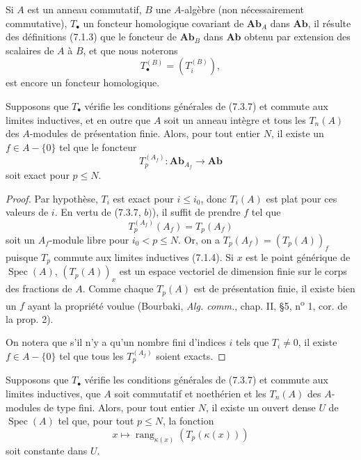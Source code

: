
\begin{env}[7.3.8]
Si $A$ est un anneau commutatif, $B$ une $A$-algèbre (non nécessairement
commutative), $T_\bullet$ un foncteur homologique covariant de
$\mathbf{Ab}_A$ dans $\mathbf{Ab}$, il résulte des définitions (7.1.3) que le
foncteur de $\mathbf{Ab}_B$ dans $\mathbf{Ab}$ obtenu par extension des
scalaires de $A$ à $B$, et que nous noterons
\[
  T_\bullet^{(B)}=(T_i^{(B)}),
\]
est encore un foncteur homologique.
\end{env}

\begin{corollary}[7.3.9]
Supposons que $T_\bullet$ vérifie les conditions générales de (7.3.7) et
commute aux limites inductives, et en outre que $A$ soit un anneau intègre et
tous les $T_n(A)$ des $A$-modules de présentation finie. Alors, pour tout
entier $N$, il existe un $f\in A-\{0\}$ tel que le foncteur
\[
  T_p^{(A_f)}:\mathbf{Ab}_{A_f}\longrightarrow\mathbf{Ab}
\]
soit exact pour $p\leq N$.
\end{corollary}

\begin{proof}
Par hypothèse, $T_i$ est exact pour $i\leq i_0$, donc $T_i(A)$ est plat pour
ces valeurs de $i$. En vertu de (7.3.7, $b)$), il suffit de prendre $f$ tel que
\[
  T_p^{(A_f)}(A_f)=T_p(A_f)
\]
soit un $A_f$-module libre pour $i_0<p\leq N$. Or, on a
$T_p(A_f)=(T_p(A))_f$ puisque $T_p$ commute aux limites inductives (7.1.4). Si
$x$ est le point générique de $\operatorname{Spec}(A)$, $(T_p(A))_x$ est un
espace vectoriel de dimension finie sur le corps des fractions de $A$. Comme
chaque $T_p(A)$ est de présentation finie, il existe bien un $f$ ayant la
propriété voulue (Bourbaki, \emph{Alg. comm.}, chap. II, \S 5,
n\textsuperscript{o} 1, cor. de la prop. 2).

On notera que s'il n'y a qu'un nombre fini d'indices $i$ tels que $T_i\ne0$,
il existe $f\in A-\{0\}$ tel que tous les $T_p^{(A_f)}$ soient exacts.
\end{proof}

\begin{corollary}[7.3.10]
Supposons que $T_\bullet$ vérifie les conditions générales de (7.3.7) et
commute aux limites inductives, que $A$ soit commutatif et noethérien et les
$T_n(A)$ des $A$-modules de type fini. Alors, pour tout entier $N$, il existe
un ouvert dense $U$ de $\operatorname{Spec}(A)$ tel que, pour tout $p\leq N$,
la fonction
\[
  x\mapsto\operatorname{rang}_{\kappa(x)}(T_p(\kappa(x)))
\]
soit constante dans $U$.
\end{corollary}

